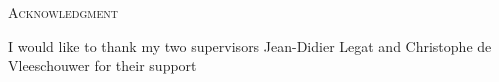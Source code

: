 
\begin{center}
\huge{\textsc{Acknowledgment}}
\end{center}
I would like to thank my two supervisors Jean-Didier Legat and Christophe de Vleeschouwer for their support
